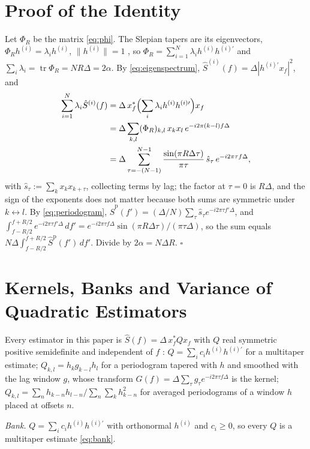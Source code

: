 \documentclass[10pt,twocolumn]{article}
\newcommand{\dd}{\,d}
\begin{document}
\appendix

\section{Proof of the Identity}
\label{app:proof}
Let $\Phi_R$ be the matrix \eqref{eq:phi}. The Slepian tapers are its eigenvectors, $\Phi_Rh^{(i)}=\lambda_ih^{(i)}$, $\|h^{(i)}\|=1$ \cite{slepian1978}, so $\Phi_R=\sum_{i=1}^N\lambda_ih^{(i)}h^{(i)\prime}$ and $\sum_i\lambda_i=\operatorname{tr}\Phi_R=NR\Delta=2\alpha$. By \eqref{eq:eigenspectrum}, $\hat S^{(i)}(f)=\Delta|h^{(i)\prime}x_f|^2$, and
\begin{align}
\sum_{i=1}^N\lambda_i\hat S^{(i)}(f)&=\Delta\,x_f^{*}\Bigl(\sum_i\lambda_ih^{(i)}h^{(i)\prime}\Bigr)x_f\notag\\
&=\Delta\sum_{k,l}(\Phi_R)_{k,l}\,x_kx_l\,e^{-i2\pi(k-l)f\Delta}\notag\\
&=\Delta\sum_{\tau=-(N-1)}^{N-1}\frac{\sin(\pi R\Delta\tau)}{\pi\tau}\,\hat s_\tau\,e^{-i2\pi\tau f\Delta},
\end{align}
with $\hat s_\tau:=\sum_kx_kx_{k+\tau}$, collecting terms by lag; the factor at $\tau=0$ is $R\Delta$, and the sign of the exponents does not matter because both sums are symmetric under $k\leftrightarrow l$. By \eqref{eq:periodogram}, $\hat S^{\mathrm p}(f')=(\Delta/N)\sum_\tau\hat s_\tau e^{-i2\pi\tau f'\Delta}$, and $\int_{f-R/2}^{f+R/2}e^{-i2\pi\tau f'\Delta}\dd f'=e^{-i2\pi\tau f\Delta}\sin(\pi R\Delta\tau)/(\pi\tau\Delta)$, so the sum equals $N\Delta\int_{f-R/2}^{f+R/2}\hat S^{\mathrm p}(f')\dd f'$. Divide by $2\alpha=N\Delta R$. $\square$


\section{Kernels, Banks and Variance of Quadratic Estimators}
\label{app:quadratic}
Every estimator in this paper is $\hat S(f)=\Delta\,x_f^{*}Qx_f$ with $Q$ real symmetric positive semidefinite and independent of $f$ \cite{percival1993,riedel1995}: $Q=\sum_ic_ih^{(i)}h^{(i)\prime}$ for a multitaper estimate; $Q_{k,l}=h_kg_{k-l}h_l$ for a periodogram tapered with $h$ and smoothed with the lag window $g$, whose transform $G(f)=\Delta\sum_\tau g_\tau e^{-i2\pi\tau f\Delta}$ is the kernel; $Q_{k,l}=\sum_nh_{k-n}h_{l-n}/\sum_n\sum_kh_{k-n}^2$ for averaged periodograms of a window $h$ placed at offsets $n$.

\emph{Bank.} $Q=\sum_ic_ih^{(i)}h^{(i)\prime}$ with orthonormal $h^{(i)}$ and $c_i\ge0$, so every $Q$ is a multitaper estimate \eqref{eq:bank}.
\end{document}
